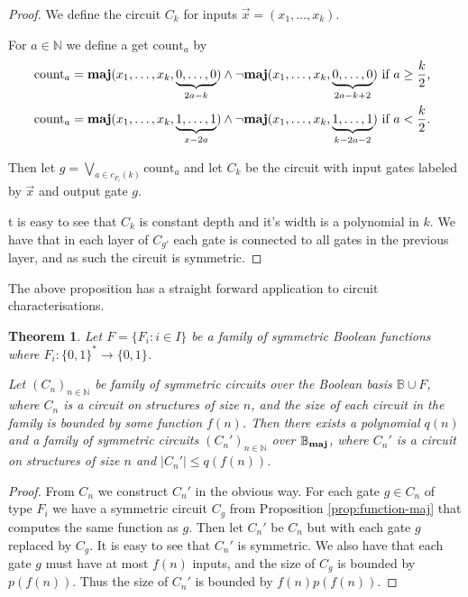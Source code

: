 \documentclass[12pt]{report}
\newtheorem{thm}{Theorem} \newtheorem{claim}[thm]{Claim}
\newcommand{\maj}{\text{\textbf{maj}}}
\newcommand{\countgate}{\text{count}}
\begin{document}
\begin{proof}
  We define the circuit $C_k$ for inputs $\vec{x} = ( x_1, \ldots, x_k )$.

  For $a \in \mathbb{N}$ we define a get $\countgate_a$ by
  \begin{align*}
    &\countgate_a = \maj (x_1, \ldots, x_k, \underbrace {0, \ldots, 0}_{2a -
      k}) \land \neg \maj (x_1, \ldots , x_k, \underbrace{0, \ldots,  0}_{2a - k + 2})\text{ if $a \geq \frac{k}{2}$,} \\
    &\countgate_a = \maj (x_1, \ldots, x_k, \underbrace {1, \ldots, 1}_{x -
      2a}) \land \neg \maj (x_1, \ldots , x_k, \underbrace{1, \ldots,
      1}_{k - 2a -2}) \text{ if $a < \frac{k}{2}$. }
  \end{align*}

  Then let $g = \bigvee_{a \in c_{F_i}(k)}\countgate_a$ and let $C_{k}$ be the
  circuit with input gates labeled by $\vec{x}$ and output gate $g$.

  t is easy to see that $C_k$ is constant depth and it's width is a polynomial
  in $k$. We have that in each layer of $C_{g'}$ each gate is connected to all
  gates in the previous layer, and as such the circuit is symmetric.
\end{proof}

The above proposition has a straight forward application to circuit
characterisations.

\begin{thm}
  Let $F = \{F_i : i \in I \}$ be a family of symmetric Boolean functions where
  $F_i: \{0,1\}^* \rightarrow \{ 0,1 \}$.

  Let $(C_n)_{n \in \mathbb{N}}$ be family of symmetric circuits over the
  Boolean basis $\mathbb{B} \cup F$, where $C_n$ is a circuit on structures of
  size $n$, and the size of each circuit in the family is bounded by some
  function $f(n)$. Then there exists a polynomial $q(n)$ and a family of
  symmetric circuits $(C_n')_{n \in \mathbb{N}}$ over $\mathbb{B}_\maj$, where
  $C_n'$ is a circuit on structures of size $n$ and $\vert C_n' \vert \leq
  q(f(n))$.
\end{thm}

\begin{proof}
  From $C_n$ we construct $C_n'$ in the obvious way. For each gate $g \in C_n$
  of type $F_i$ we have a symmetric circuit $C_g$ from Proposition
  \ref{prop:function-maj} that computes the same function as $g$. Then let
  $C_n'$ be $C_n$ but with each gate $g$ replaced by $C_g$. It is easy to see
  that $C_n'$ is symmetric. We also have that each gate $g$ must have at most
  $f(n)$ inputs, and the size of $C_g$ is bounded by $p(f(n))$. Thus the size of
  $C_n'$ is bounded by $f(n)p(f(n))$.
\end{proof}
\end{document}
